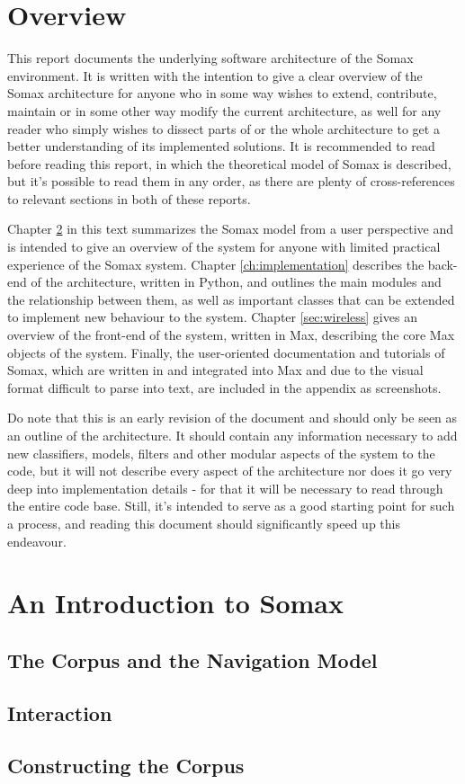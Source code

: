 \section{Overview}\label{sec:1-overview}
This report documents the underlying software architecture of the Somax environment. It is written with the intention to give a clear overview of the Somax architecture for anyone who in some way wishes to extend, contribute, maintain or in some other way modify the current architecture, as well for any reader who simply wishes to dissect parts of or the whole architecture to get a better understanding of its implemented solutions. It is recommended to read \cite{somaxtheory2021} before reading this report, in which the theoretical model of Somax is described, but it's possible to read them in any order, as there are plenty of cross-references to relevant sections in both of these reports. 

Chapter \ref{sec:2-gentleintro} in this text summarizes the Somax model from a user perspective and is intended to give an overview of the system for anyone with limited practical experience of the Somax system. Chapter \ref{ch:implementation} describes the back-end of the architecture, written in Python, and outlines the main modules and the relationship between them, as well as important classes that can be extended to implement new behaviour to the system. Chapter \ref{sec:wireless} gives an overview of the front-end of the system, written in Max, describing the core Max objects of the system. Finally, the user-oriented documentation and tutorials of Somax, which are written in and integrated into Max and due to the visual format difficult to parse into text, are included in the appendix as screenshots.

Do note that this is an early revision of the document and should only be seen as an outline of the architecture. It should contain any information necessary to add new classifiers, models, filters and other modular aspects of the system to the code, but it will not describe every aspect of the architecture nor does it go very deep into implementation details - for that it will be necessary to read through the entire code base. Still, it's intended to serve as a good starting point for such a process, and reading this document should  significantly speed up this endeavour.
\begingroup
	\graphicspath{{../SomaxOverview/}}
	\section{An Introduction to Somax}\label{sec:2-gentleintro}
	
	\subsection{The Corpus and the Navigation Model}\label{ssec:1-corpusnavigationmodel}
	
	\subsection{Interaction}
	
	\subsection{Constructing the Corpus}
	
\endgroup